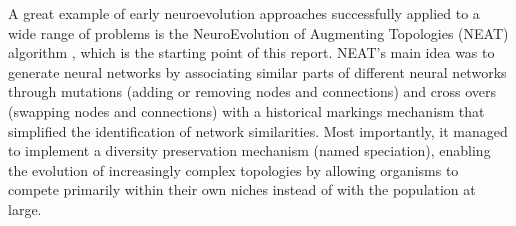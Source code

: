 \documentclass[12pt]{article}
\begin{document}
    \begin{comment}SOBRE NEAT\\\end{comment}

A great example of early neuroevolution approaches successfully applied to a wide range of problems is the NeuroEvolution of Augmenting Topologies (NEAT) algorithm \cite{NEAT}, which is the starting point of this report. 
NEAT's main idea was to generate neural networks by associating similar parts of different neural networks through mutations (adding or removing nodes and connections) and cross overs (swapping nodes and connections) with a historical markings mechanism that simplified the identification of network similarities. Most importantly, it managed to implement a diversity preservation mechanism (named speciation), enabling the evolution of increasingly complex topologies by allowing organisms to compete primarily within their own niches instead of with the population at large.

    \begin{comment}
    A great example of early neuroevolution approaches succesfully applied to a wide range of problems is the NeuroEvolution of Augmenting Topologies (NEAT) algorithm \cite{NEAT}. 
    NEAT managed to mutate and cross over similar parts of different topologies to generate intermediate solutions with the goal of achieving better results than the original topologies. Most notably, it managed to implement a mechanism to preserve diversity (named speciation), allowing the evolution of increasingly complex topologies while still exploring different search spaces by allowing organisms to compete primarily within their own niches instead of with
    the population at large.
    \end{comment}

    \begin{comment}
    As noted by \cite{Stanley2019},
    although impressive, especially in their day, all of the successful
    applications [CAN EXPAND] using NEAT or similarly inspired algorithms involved tiny neural networks by modern standards, composed of hundreds or thousands of connections instead of the millions of connections commonly seen in modern deep neural network (DNN) research.
    \end{comment}
    
\end{document}
